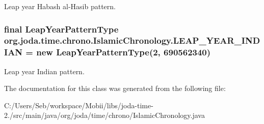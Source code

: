 Leap year Habash al-\/\-Hasib pattern. \hypertarget{classorg_1_1joda_1_1time_1_1chrono_1_1_islamic_chronology_a3df09d501cb3b9178f69b1b2f043dc39}{
\subsubsection[{L\-E\-A\-P\-\_\-\-Y\-E\-A\-R\-\_\-\-I\-N\-D\-I\-A\-N}]{\setlength{\rightskip}{0pt plus 5cm}final Leap\-Year\-Pattern\-Type org.\-joda.\-time.\-chrono.\-Islamic\-Chronology.\-L\-E\-A\-P\-\_\-\-Y\-E\-A\-R\-\_\-\-I\-N\-D\-I\-A\-N = new Leap\-Year\-Pattern\-Type(2, 690562340)\hspace{0.3cm}{\ttfamily [static]}}}\label{classorg_1_1joda_1_1time_1_1chrono_1_1_islamic_chronology_a3df09d501cb3b9178f69b1b2f043dc39}
Leap year Indian pattern. 

The documentation for this class was generated from the following file\-:\begin{DoxyCompactItemize}
\item 
C\-:/\-Users/\-Seb/workspace/\-Mobii/libs/joda-\/time-\/2./src/main/java/org/joda/time/chrono/Islamic\-Chronology.\-java\end{DoxyCompactItemize}
